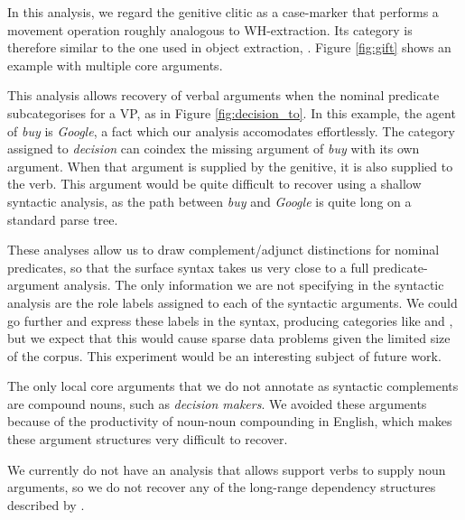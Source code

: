 \documentclass[11pt]{article}
\begin{document}
In this analysis, we regard the genitive clitic as a case-marker that performs
a movement operation roughly analogous to WH-extraction. Its category is
therefore similar to the one used in object extraction,  .
Figure \ref{fig:gift} shows an example with multiple core arguments.

This analysis allows recovery of verbal arguments when the nominal predicate
subcategorises for a VP, as in Figure \ref{fig:decision_to}.
In this example, the agent of \emph{buy} is \emph{Google}, a fact which our
analysis accomodates effortlessly. The category assigned to \emph{decision}
can coindex the missing  argument of \emph{buy} with its own
 argument. When that argument is supplied by the genitive, it is also
supplied to the verb. This argument would be quite difficult to recover using a
shallow syntactic analysis, as the path between \emph{buy} and \emph{Google}
is quite long on a standard parse tree.

These analyses allow us to draw complement/adjunct distinctions for nominal
predicates, so that the surface syntax takes us very close to a full
predicate-argument analysis. The only information we are not specifying in the
syntactic analysis are the role labels assigned to each of the syntactic
arguments. We could go further and express these labels in the syntax, producing
categories like  and , but we
expect that this would cause sparse data problems given the limited size of
the corpus. This experiment would be an interesting subject of future work.

The only local core arguments that we do not annotate as syntactic complements
are compound nouns, such as \emph{decision makers}. We avoided these arguments
because of the productivity of noun-noun compounding in English, which makes
these argument structures very difficult to recover.

We currently do not have an analysis that allows support verbs to supply noun
arguments, so we do not recover any of the long-range dependency structures
described by \citet{nombank}.

% 
\end{document}
